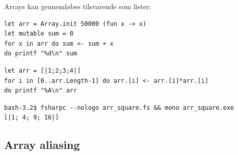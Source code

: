 \documentclass[rgb]{beamer}
\begin{document}
\begin{frame}[fragile]
\begin{footnotesize}

Arrays kan gennemløbes tilsvarende som lister:

\vspace{1ex}

\begin{lstlisting}[numbers=none,frame=none,mathescape]
let arr = Array.init 50000 (fun x -> x)
let mutable sum = 0
for x in arr do sum <- sum + x
do printf "%d\n" sum
\end{lstlisting}

\vspace{1ex}

\begin{lstlisting}[numbers=none,frame=none,mathescape]
let arr = [|1;2;3;4|]
for i in [0..arr.Length-1] do arr.[i] <- arr.[i]*arr.[i]
do printf "%A\n" arr
\end{lstlisting}

\vspace{1ex}

\begin{verbatim}
bash-3.2$ fsharpc --nologo arr_square.fs && mono arr_square.exe
[|1; 4; 9; 16|]
\end{verbatim}
\end{footnotesize}
\end{frame}

\subsection{Array aliasing}
\end{document}
